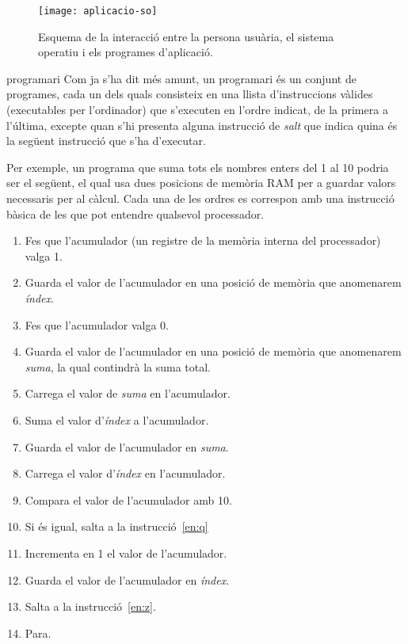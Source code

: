 \begin{figure}
  \centering
  \texttt{[image: aplicacio-so]}
  \caption{Esquema de la interacció entre la persona usuària, el
    sistema operatiu i els programes d'aplicació.}
  \label{fg:aplicacio-so}
\end{figure}

\begin{persabermes}{programari}
Com ja s'ha dit més amunt, un programari és un conjunt de programes,
cada un dels quals consisteix en una llista d'instruccions vàlides
(executables per l'ordinador) que s'executen en l'ordre indicat, de
la primera a l'última, excepte quan s'hi presenta alguna instrucció
de \emph{salt} que indica quina és la següent instrucció que s'ha
d'executar.

Per exemple, un programa que suma tots els nombres enters del 1 al 10
podria ser el següent, el qual usa dues posicions de memòria RAM per a
guardar valors necessaris per al càlcul. Cada una de les ordres es
correspon amb una instrucció bàsica de les que pot entendre qualsevol
processador.
\begin{enumerate}
\item Fes que l'acumulador (un registre de la memòria interna del
  processador) valga 1.
\item Guarda el valor de l'acumulador en una posició de memòria que
  anomenarem \emph{índex}.
\item Fes que l'acumulador valga 0.
\item Guarda el valor de l'acumulador en una posició de memòria que
  anomenarem \emph{suma}, la qual contindrà la suma total.
\item \label{en:z} Carrega el valor de \emph{suma} en l'acumulador.
\item Suma el valor d'\emph{índex} a l'acumulador.
\item Guarda el valor de l'acumulador en \emph{suma}.
\item Carrega el valor d'\emph{índex} en l'acumulador.
\item Compara el valor de l'acumulador amb 10.
\item Si és igual, salta a la instrucció~\ref{en:q}
\item Incrementa en 1 el valor de l'acumulador.
\item Guarda el valor de l'acumulador en \emph{índex}.
\item Salta a la instrucció~\ref{en:z}.
\item \label{en:q} Para.
\end{enumerate}


\end{persabermes}
